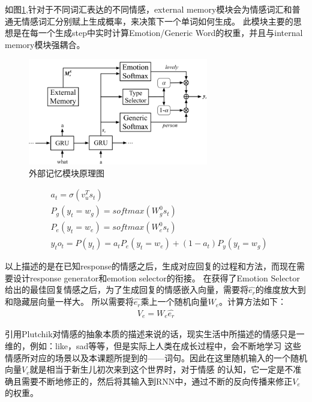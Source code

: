 \documentclass[supercite]{HustGraduPaper}
\theoremstyle{definition}
\begin{document}
如图\ref{Fig.ememory},针对于不同词汇表达的不同情感，external memory模块会为情感词汇和普通无情感词汇分别赋上生成概率，来决策下一个单词如何生成。
此模块主要的思想是在每一个生成step中实时计算Emotion/Generic Word的权重，并且与internal memory模块强耦合。

\begin{figure}[H] %
  \centering %
  \includegraphics[width=0.7\textwidth]{images/ememory.png} %
  \caption{外部记忆模块原理图} %
  \label{Fig.ememory} %
\end{figure}

\begin{align}
  &a_t = \sigma(v_u^T s_t)\\
  &P_g(y_t = w_g) = softmax(W_g^0 s_t)\\
  &P_e(y_t = w_e) = softmax(W_e^0 s_t)\\
  &y_t o_t = P(y_t) = a_t P_e(y_t=w_e) + (1-a_t)P_y(y_t=w_g)
\end{align}

以上描述的是在已知response的情感之后，生成对应回复的过程和方法，而现在需要设计response generator和emotion selector的衔接。
在获得了Emotion Selector给出的最佳回复情感之后，为了生成回复的情感嵌入向量，需要将$\hat{e_r}$的维度放大到和隐藏层向量一样大。
所以需要将$\hat{e_r}$乘上一个随机向量$W_e$。计算方法如下：
\begin{align}
  V_e = W_e \hat{e_r} \label{3.16} 
\end{align}

引用Plutchik\cite{plutchik1980general}对情感的抽象本质的描述来说的话，现实生活中所描述的情感只是一维的，例如：like，sad等等，但是实际上人类在成长过程中，会不断地学习
这些情感所对应的场景以及本课题所提到的——词句。因此在这里随机输入的一个随机向量$V_e$就是相当于新生儿初次来到这个世界时，对于情感
的认知，它一定是不准确且需要不断地修正的，然后将其输入到RNN中，通过不断的反向传播来修正$V_e$的权重。
\end{document}
